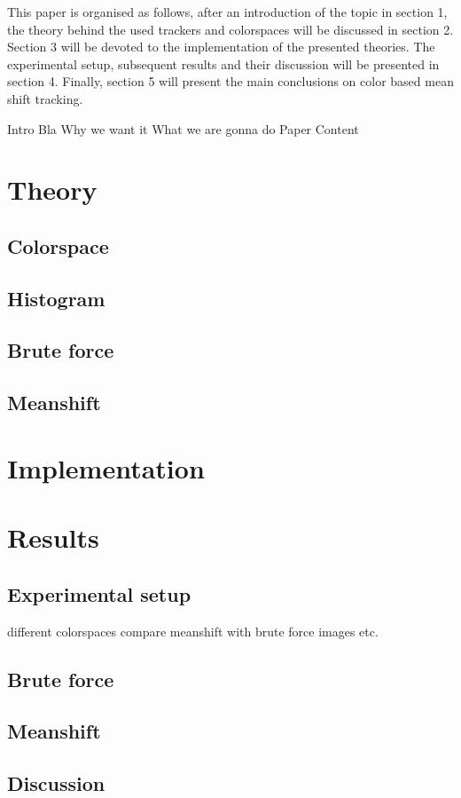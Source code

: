 \documentclass[a4paper,11pt]{article}
\begin{document}
This paper is organised as follows, after an introduction of the topic in section 1, the theory behind the used trackers and colorspaces will be discussed in section 2.
Section 3 will be devoted to the implementation of the presented theories. The experimental setup, subsequent results and their discussion will be presented in section 4. 
Finally, section 5 will present the main conclusions on color based mean shift tracking.

Intro Bla
Why we want it
What we are gonna do
Paper Content
\section{Theory}
	\subsection{Colorspace}
	\subsection{Histogram}
	\subsection{Brute force}
	\subsection{Meanshift}

\section{Implementation}

\section{Results} 
	\subsection{Experimental setup} 
	different colorspaces
	compare meanshift with brute force
	images etc.
	\subsection{Brute force} 
	\subsection{Meanshift} 
\subsection{Discussion} %
\end{document}
